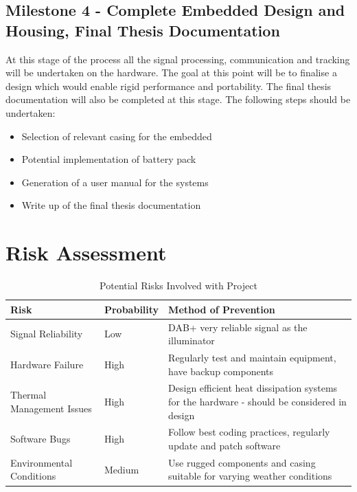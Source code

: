 \documentclass[12pt,a4paper]{article}
\begin{document}
\subsection{Milestone 4 - Complete Embedded Design and Housing, Final Thesis Documentation} 
At this stage of the process all the signal processing, communication and tracking will be undertaken on the hardware. The goal at this point will be to finalise a design which would enable rigid performance and portability. The final thesis documentation will also be completed at this stage. The following steps should be undertaken:
\begin{multicols}{2}
    \begin{itemize}
    \item Selection of relevant casing for the embedded
    \item Potential implementation of battery pack
    \item Generation of a user manual for the systems
    \item Write up of the final thesis documentation
    \end{itemize} 
\end{multicols}

\newpage
\section{Risk Assessment}

\begin{table}[htbp]
    \centering
    \caption{Potential Risks Involved with Project}
    \vspace{0.5cm}
    \begin{tabular}{|>{\raggedright\arraybackslash}p{3cm}|p{3cm}|p{6cm}|}
    \hline
    \rowcolor{gray!30} \textbf{Risk} & \textbf{Probability} & \textbf{Method of Prevention} \\
    \hline
    Signal Reliability & Low & DAB+ very reliable signal as the illuminator \\
    \hline
    Hardware Failure & High & Regularly test and maintain equipment, have backup components \\
    \hline
    Thermal Management Issues & High & Design efficient heat dissipation systems for the hardware - should be considered in design \\
    \hline
    Software Bugs & High & Follow best coding practices, regularly update and patch software \\
    \hline
    Environmental Conditions & Medium & Use rugged components and casing suitable for varying weather conditions \\
    \hline
    \end{tabular}
    \label{table:risks}
    \end{table}
    
\end{document}
